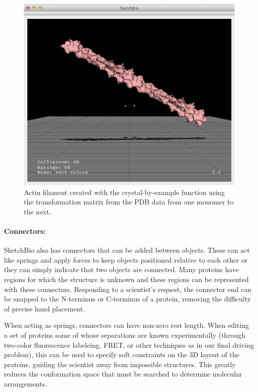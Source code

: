 \documentclass[twocolumn]{bmcart}%
\begin{document}
\begin{figure}[h]
\centering
\includegraphics[width=0.9\columnwidth]{crystal_actin.png}
\caption{Actin filament created with the crystal-by-example function using the transformation matrix from the PDB data from one monomer to the next.}
\label{fig:crystal_actin}
\end{figure}


\paragraph*{Connectors:}
SketchBio also has connectors that can be added between objects.
These can act like springs and apply forces to keep objects positioned relative to each other or they can simply indicate that two objects are connected.
Many proteins have regions for which the structure is unknown and these regions can be represented with these connectors.
Responding to a scientist's request, the connector end can be snapped to the N-terminus or C-terminus of a protein, removing the difficulty of precise hand placement.

When acting as springs, connectors can have non-zero rest length.
When editing a set of proteins some of whose separations are known experimentally (through two-color fluorescence labeleing, FRET, or other techniques as in our final driving problem), this can be used to specify soft constraints on the 3D layout of the proteins, guiding the scientist away from impossible structures. This greatly reduces the conformation space that must be searched to determine molecular arrangements.
\end{document}
